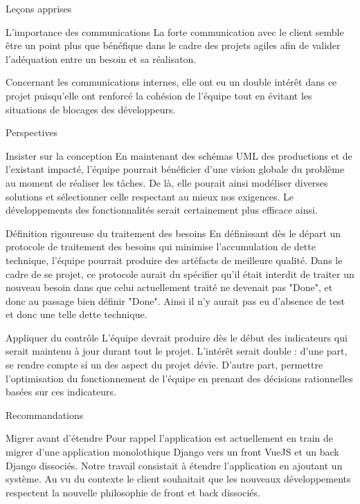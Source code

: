 \documentclass[]{article}
\begin{document}
{\begin{section}{Leçons apprises}
 \begin{subsection}{L'importance des communications}
     La forte communication avec le client semble être un point plus que bénéfique dans le cadre des projets agiles afin de valider l'adéquation entre un besoin et sa réalisaton. 

     Concernant les communications internes, elle ont eu un double intérêt dans ce projet puisqu'elle ont renforcé la cohésion de l'équipe tout en évitant les situations de blocages des développeurs.
 \end{subsection}
\end{section}

\begin{section}{Perspectives}
 \begin{subsection}{Insister sur la conception}
     En maintenant des schémas UML des productions et de l'existant impacté, l'équipe pourrait bénéficier d'une vision globale du problème au moment de réaliser les tâches. De là, elle pourait ainsi modéliser diverses solutions et sélectionner celle respectant au mieux nos exigences. Le développements des fonctionnalités serait certainement plus efficace ainsi.
 \end{subsection}

 \begin{subsection}{Définition rigoureuse du traitement des besoins}
     En définissant dès le départ un protocole de traitement des besoins qui minimise l'accumulation de dette technique, l'équipe pourrait produire des artéfacts de meilleure qualité. Dans le cadre de se projet, ce protocole aurait du spécifier qu'il était interdit de traiter un nouveau besoin dans que celui actuellement traité ne devenait pas "Done", et donc au passage bien définir "Done". Ainsi il n'y aurait pas eu d'absence de test et donc une telle dette technique.
 \end{subsection}

 \begin{subsection}{Appliquer du contrôle}
     L'équipe devrait produire dès le début des indicateurs qui serait maintenu à jour durant tout le projet. L'intérêt serait double : d'une part, se rendre compte si un des aspect du projet dévie. D'autre part, permettre l'optimisation du fonctionnement de l'équipe en prenant des décisions rationnelles basées sur ces indicateurs.
 \end{subsection}
\end{section}

\begin{section}{Recommandations}
 \begin{subsection}{Migrer avant d'étendre}
     Pour rappel l'application est actuellement en train de migrer d'une application monolothique Django vers un front VueJS et un back Django dissociés. Notre travail consistait à étendre l'application en ajoutant un système. Au vu du contexte le client souhaitait que les nouveaux développements respectent la nouvelle philosophie de front et back dissociés.


\end{subsection}
\end{section}}
\end{document}
